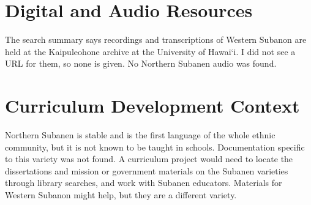 \documentclass[12pt]{article}
\begin{document}
\section{Digital and Audio Resources}
The search summary says recordings and transcriptions of Western Subanon are held at the Kaipuleohone archive at the University of Hawai\textquoteleft i. I did not see a URL for them, so none is given. No Northern Subanen audio was found.

\section{Curriculum Development Context}
Northern Subanen is stable and is the first language of the whole ethnic community, but it is not known to be taught in schools. Documentation specific to this variety was not found. A curriculum project would need to locate the dissertations and mission or government materials on the Subanen varieties through library searches, and work with Subanen educators. Materials for Western Subanon might help, but they are a different variety.
\end{document}
